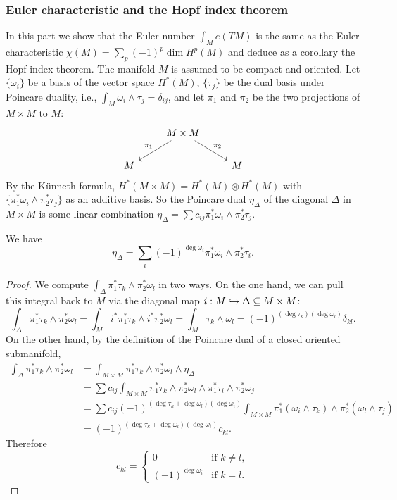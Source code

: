 \subsubsection{Euler characteristic and the Hopf index theorem}
In this part we show that the Euler number $\int_Me(TM)$ is the same as the Euler characteristic $\chi(M)=\sum_p(-1)^p\dim H^p(M)$ and deduce as a corollary the Hopf 
index theorem. The manifold $M$ is assumed to be compact and oriented.
Let $\{\omega_i\}$ be a basis of the vector space $H^*(M)$, $\{\tau_j\}$ be the dual basis under Poincare duality, i.e., $\int_M\omega_i\wedge\tau_j=\delta_{ij}$, and 
let $\pi_1$ and $\pi_2$ be the two projections of $M\times M$ to $M$:
\[\begin{tikzcd}
&M\times M\ar[ld,swap,"\pi_1"]\ar[rd,"\pi_2"]&\\
M&&M
\end{tikzcd}\]
By the K\"unneth formula, $H^*(M\times M)=H^*(M)\otimes H^*(M)$ with $\{\pi_1^*\omega_i\wedge\pi_2^*\tau_j\}$ as an additive basis. So the Poincare dual $\eta_{\Delta}$ of 
the diagonal $\Delta$ in $M\times M$ is some linear combination $\eta_{\Delta}=\sum c_{ij}\pi_1^*\omega_i\wedge\pi_2^*\tau_j$.
\begin{lemma}\label{Poincare dual diagonal}
We have 
\[\eta_{\Delta}=\sum_i(-1)^{\deg\omega_i}\pi_1^*\omega_i\wedge\pi_2^*\tau_i.\]
\end{lemma}
\begin{proof}
We compute $\int_{\Delta}\pi_1^*\tau_k\wedge\pi_2^*\omega_l$ in two ways. On the one hand, we can pull this integral back to $M$ via the diagonal map $i:M\hookrightarrow\Delta\subseteq M\times M$:
\[\int_{\Delta}\pi_1^*\tau_k\wedge\pi_2^*\omega_l=\int_{M}i^*\pi_1^*\tau_k\wedge i^*\pi_2^*\omega_l=\int_M\tau_k\wedge\omega_l=(-1)^{(\deg\tau_k)(\deg\omega_l)}\delta_{kl}.\]
On the other hand, by the definition of the Poincare dual of a closed oriented submanifold,
\begin{align*}
\int_{\Delta}\pi_1^*\tau_k\wedge\pi_2^*\omega_l&=\int_{M\times M}\pi_1^*\tau_k\wedge\pi_2^*\omega_l\wedge\eta_{\Delta}\\
&=\sum c_{ij}\int_{M\times M}\pi_1^*\tau_k\wedge\pi_2^*\omega_l\wedge\pi_1^*\tau_i\wedge\pi_2^*\omega_j\\
&=\sum c_{ij}(-1)^{(\deg\tau_k+\deg\omega_l)(\deg\omega_i)}\int_{M\times M}\pi_1^*(\omega_i\wedge\tau_k)\wedge\pi_2^*(\omega_l\wedge\tau_j)\\
&=(-1)^{(\deg\tau_k+\deg\omega_l)(\deg\omega_i)}c_{kl}.
\end{align*}
Therefore
\[c_{kl}=\begin{cases}
0&\text{if $k\neq l$},\\
(-1)^{\deg \omega_i}&\text{if $k=l$}.
\end{cases}\]
\end{proof}
